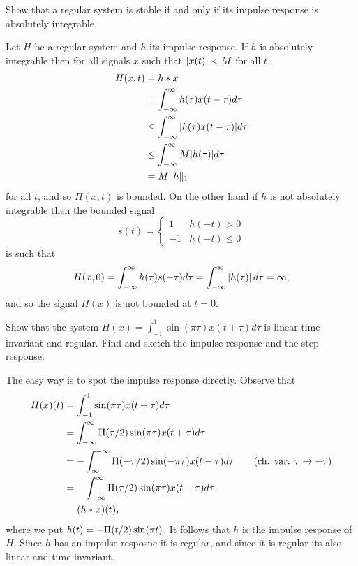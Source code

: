 \begin{excersizelist}
\item \label{excer:bibostableimpulseresp} Show that a regular system is stable if and only if its impulse response is absolutely integrable.
\begin{solution}
Let $H$ be a regular system and $h$ its impulse response.  If $h$ is absolutely integrable then for all signals $x$ such that $\vert x(t) \vert < M$ for all $t$,
\begin{align*}
H(x,t) &= h * x \\
&= \int_{-\infty}^\infty h(\tau)  x(t - \tau) d\tau \\
&\leq \int_{-\infty}^\infty \vert h(\tau) x(t - \tau) \vert d\tau \\
&\leq \int_{-\infty}^\infty M \vert h(\tau) \vert d\tau \\
&= M \|h\|_1
\end{align*}
for all $t$, and so $H(x,t)$ is bounded.  On the other hand if $h$ is not absolutely integrable then the bounded signal 
\[
s(t) = \begin{cases}
1 & h(-t) > 0 \\
-1 & h(-t) \leq 0
\end{cases}
\]
is such that
\[
H(x,0) = \int_{-\infty}^\infty h(\tau)  s(-\tau) d\tau = \int_{-\infty}^\infty \left\vert h(\tau) \right\vert d\tau = \infty,
\]
and so the signal $H(x)$ is not bounded at $t = 0$.
\end{solution}

\item Show that the system $H(x) = \int_{-1}^{1} \sin(\pi\tau) x(t + \tau) d\tau$ is linear time invariant and regular.  Find and sketch the impulse response and the step response.
\begin{solution}
The easy way is to spot the impulse response directly.  Observe that
\begin{align*}
H(x)(t) &= \int_{-1}^{1} \sin(\pi\tau) x(t + \tau) d\tau \\
&= \int_{-\infty}^\infty \Pi(\tau/2) \sin(\pi\tau) x(t + \tau) d\tau\\
&= -\int_{\infty}^{-\infty} \Pi(-\tau/2) \sin(-\pi\tau) x(t - \tau) d\tau \qquad \text{(ch. var. $\tau \to -\tau$)} \\
&= -\int_{-\infty}^{\infty} \Pi(\tau/2) \sin(\pi\tau) x(t - \tau) d\tau \\
&= (h * x)(t),
\end{align*}
where we put $h(t) = -\Pi(t/2) \sin(\pi t)$.  It follows that $h$ is the impulse response of $H$.  Since $h$ has an impulse resposne it is regular, and since it is regular its also linear and time invariant.


\end{solution}
\end{excersizelist}
